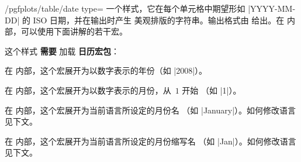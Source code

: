 \documentclass[a4paper,doc2]{ltxdoc}
\begin{document}
\begin{stylekey}{/pgfplots/table/date type=}%
    一个样式，它在每个单元格中期望形如 |YYYY-MM-DD| 的 ISO 日期，并在输出时产生
    美观排版的字符串。输出格式由  给出。在 
    内部，可以使用下面讲解的若干宏。
\begin{codeexample}[]

%

\hspace{1cm}
\end{codeexample}
    这个样式 \textbf{需要} 加载 \PGF{} \textbf{日历宏包}：
\begin{codeexample}
\usepackage{pgfcalendar}
\end{codeexample}

    \begin{command}{\year}
        在  内部，这个宏展开为以数字表示的年份（如 |2008|）。
    \end{command}

    \begin{command}{\month}
        在  内部，这个宏展开为以数字表示的月份，从~$1$ 开始
        （如 |1|）。
    \end{command}

    \begin{command}{\monthname}
        在  内部，这个宏展开为当前语言所设定的月份名
        （如 |January|）。如何修改语言见下文。
    \end{command}

    \begin{command}{\monthshortname}
        在  内部，这个宏展开为当前语言所设定的月份缩写名
        （如 |Jan|）。如何修改语言见下文。
    \end{command}


\end{stylekey}
\end{document}
